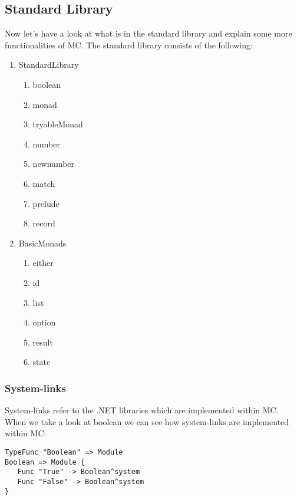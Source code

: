 \subsection{Standard Library}
Now let's have a look at what is in the standard library and explain some more functionalities of MC.
The standard library consists of the following:
\begin{multicols}{2}
   \begin{enumerate}
      \item StandardLibrary
         \begin{enumerate}
            \item boolean
            \item monad
            \item tryableMonad
            \item number
            \item newnumber
            \item match
            \item prelude
            \item record
         \end{enumerate}
      \item BasicMonads
         \begin{enumerate}
            \item either
            \item id
            \item list
            \item option
            \item result
            \item state
         \end{enumerate}
   \end{enumerate}
\end{multicols}

\subsubsection{System-links}\label{sec:system}
System-links refer to the .NET libraries which are implemented within MC.
When we take a look at boolean we can see how system-links are implemented within MC:

\begin{lstlisting}
TypeFunc "Boolean" => Module
Boolean => Module {
   Func "True" -> Boolean^system
   Func "False" -> Boolean^system
}
\end{lstlisting}

